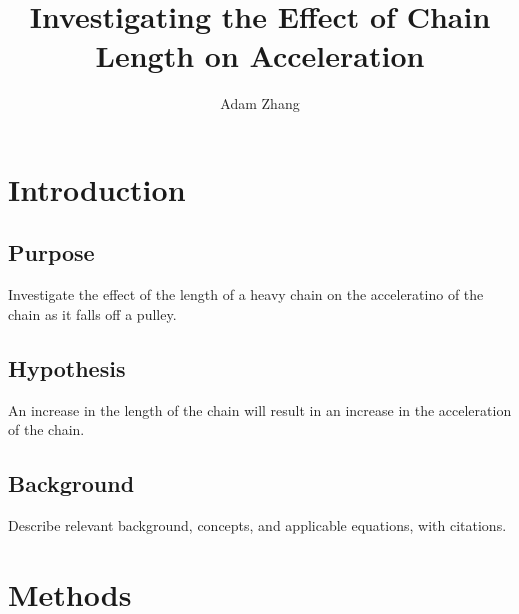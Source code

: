 \documentclass[stu,biblatex,floatsintext,draftall]{apa7}
\title{Investigating the Effect of Chain Length on Acceleration}
\author{Adam Zhang}
\affiliation{Academies of Loudoun}
\begin{document}
\maketitle
\tableofcontents
\newpage

\section{Introduction}

\subsection{Purpose}
Investigate the effect of the length of a heavy chain on the acceleratino of the chain as it falls off a pulley.

\subsection{Hypothesis}
An increase in the length of the chain will result in an increase in the acceleration of the chain.

\subsection{Background}
Describe relevant background, concepts, and applicable equations, with citations.

\section{Methods}
\end{document}
